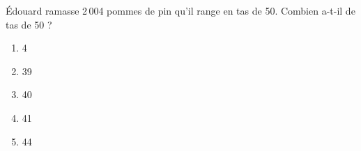 \'Edouard ramasse 2\,004 pommes de pin qu'il range en tas de 50. Combien a-t-il de tas de 50 ?
\begin{multicols}{5}
  \begin{enumerate}[A/]
  \item 4
  \item 39
  \item 40
  \item 41
  \item 44
  \end{enumerate}
\end{multicols}
